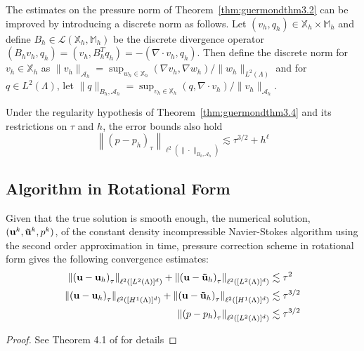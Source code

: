 \documentclass[letterpaper]{erdc}
\begin{document}
The estimates on the pressure norm of Theorem~\ref{thm:guermondthm3.2} can be improved by introducing a discrete norm as follows.  Let $(v_h,q_h) \in \mathbb{X}_h\times \mathbb{M}_h$ and define $B_h \in \mathcal{L}(\mathbb{X}_h,\mathbb{M}_h)$ be the discrete divergence operator $(B_h v_h, q_h) = (v_h, B_h^T q_h) = -(\nabla\cdot v_h, q_h)$.  Then define the discrete norm for $v_h \in \mathbb{X}_h$ as $\|v_h\|_{\mathcal{A}_h} = \sup_{w_h \in \mathbb{X}_h} (\nabla v_h, \nabla w_h)/ \|w_h\|_{L^2(\Lambda)}$ and for $q\in L^2(\Lambda)$, let $\|q\|_{B_h, \mathcal{A}_h} = \sup_{v_h\in \mathbb{X}_h} (q, \nabla\cdot v_h)/ \|v_h\|_{\mathcal{A}_h}$.

\begin{theorem}\label{thm:guermondthm3.5}
Under the regularity hypothesis of Theorem~\ref{thm:guermondthm3.4} and its restrictions on $\tau$ and $h$, the error bounds also hold
    \begin{equation}
      \left\| \left(p - p_h \right)_{\tau} \right\|_{\ell^{2}\left(\|\cdot\|_{B_h, \mathcal{A}_h}\right)} \lesssim \tau^{3/2} + h^{\ell}
    \end{equation}
\end{theorem}


%
%
\subsection{Algorithm in Rotational Form}

\begin{theorem}
Given that the true solution is smooth enough, the numerical solution, $(\textbf{u}^k, \mathbf{\tilde{u}}^k, p^k)$, of the constant density incompressible Navier-Stokes algorithm using the second order approximation in time, pressure correction scheme in rotational form gives the following convergence estimates:
\begin{align*}
\left\| \left(\textbf{u} - \textbf{u}_h\right)_{\tau} \right\|_{\ell^2\left([L^2(\Lambda)]^d \right)} + \left\| \left(\textbf{u} - \mathbf{\tilde{u}}_h\right)_{\tau} \right\|_{\ell^2\left([L^2(\Lambda)]^d \right)} &\lesssim \tau^2\\
\left\| \left(\textbf{u} - \textbf{u}_h\right)_{\tau} \right\|_{\ell^2\left([H^1(\Lambda)]^d \right)} + \left\| \left(\textbf{u} - \mathbf{\tilde{u}}_h\right)_{\tau} \right\|_{\ell^2\left([H^1(\Lambda)]^d \right)}  &\lesssim \tau^{3/2}\\
 \left\| \left(p - p_h\right)_{\tau} \right\|_{\ell^2\left([L^2(\Lambda)]^d \right)} &\lesssim \tau^{3/2}
\end{align*}

\end{theorem}
\begin{proof}
See Theorem 4.1 of \cite{guermond2004error} for details
\end{proof}
\end{document}
